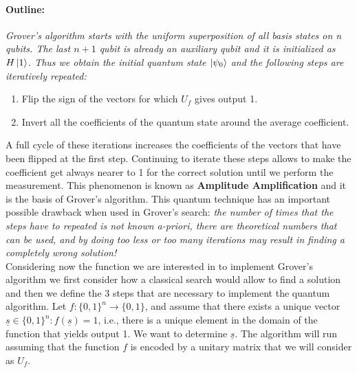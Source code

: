 \documentclass[english]{article}
\begin{document}
			\paragraph{Outline:} \emph{Grover's algorithm starts with the uniform superposition of all basis states on n qubits. The last $n + 1$ qubit is already an auxiliary qubit and it is initialized as $H\left\vert{1}\right\rangle$. Thus we obtain the initial quantum state $\left\vert{\psi_0}\right\rangle$ and the following steps are iteratively repeated:}
			\begin{enumerate}
				\item Flip the sign of the vectors for which $U_f$ gives output 1.
				\item Invert all the coefficients of the quantum state around the average coefficient.
			\end{enumerate}
			A full cycle of these iterations increases the coefficients of the vectors that have been flipped at the first step. Continuing to iterate these steps allows to make the coefficient get always nearer to 1 for the correct solution until we perform the measurement. This phenomenon is known as \textbf{Amplitude Amplification} and it is the basis of Grover's algorithm. This quantum technique has an important possible drawback when used in Grover's search: \emph{the number of times that the steps have to repeated is not known a-priori, there are theoretical numbers that can be used, and by doing too less or too many iterations may result in finding a completely wrong solution!} \\
		
			Considering now the function we are interested in to implement Grover's algorithm we first consider how a classical search would allow to find a solution and then we define the 3 steps that are necessary to implement the quantum algorithm. Let $f:\{0,1\}^n \rightarrow \{0,1\}$, and assume that there exists a unique vector $\underline{s}\in\{0,1\}^n : f(\underline{s}) = 1$, i.e., there is a unique element in the domain of the function that yields output 1. We want to determine $\underline{s}$. The algorithm will run assuming that the function $f$ is encoded by a unitary matrix that we will consider as $U_f$.
			
\end{document}
